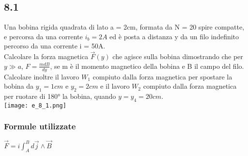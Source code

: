 \documentclass[../../main.tex]{subfiles}
\begin{document}
\subsection*{8.1}
Una bobina rigida quadrata di lato a = 2cm, formata da N = 20 spire compatte, e percorsa da una corrente $i_b = 2A$ ed è posta a distanza y da un filo indefinito percorso da una corrente i = 50A.
\\Calcolare la forza magnetica $\vec{F}(y) $ che agisce sulla bobina dimostrando che per $y \gg a$, $F=\frac{mdB}{dy}$, se m è il momento magnetico della bobina e B il campo del filo.
\\Calcolare inoltre il lavoro $W_1$ compiuto dalla forza magnetica per spostare la bobina da $y_1=1cm$ e $y_2 = 2cm$ e il lavoro $W_2$ compiuto dalla forza magnetica per ruotare di 180° la bobina, quando $y=y_4=20cm$.
\\\texttt{[image: e\_8\_1.png]}
\subsubsection*{Formule utilizzate}
$\vec{F} = i\int_A^Bd\vec{j}\wedge\vec{B}$
\end{document}

